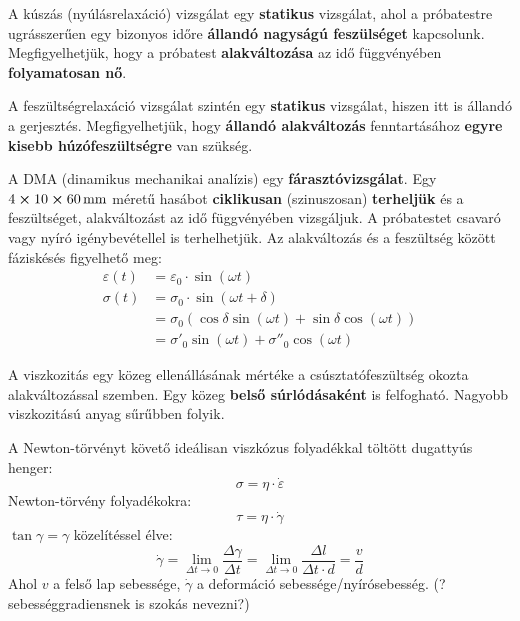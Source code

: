 \documentclass[12pt,a4paper]{article}       %
\begin{document}
\begin{tcbitemize}
  \tcbitem[title={\# \thetcbrasternum{} –
        Mi a kúszás?
      }]
  A kúszás (nyúlásrelaxáció) vizsgálat egy \textbf{statikus} vizsgálat, ahol a
  próbatestre ugrásszerűen egy bizonyos időre \textbf{állandó nagyságú
    feszülséget} kapcsolunk. Megfigyelhetjük, hogy a próbatest
  \textbf{alakváltozása} az idő függvényében \textbf{folyamatosan nő}.



  \tcbitem[title={\# \thetcbrasternum{} –
        Mi a feszültségrelaxáció?
      }]
  A feszültségrelaxáció vizsgálat szintén egy \textbf{statikus} vizsgálat,
  hiszen itt is állandó a gerjesztés. Megfigyelhetjük, hogy \textbf{állandó
    alakváltozás} fenntartásához \textbf{egyre kisebb húzófeszültségre} van
  szükség.




  \tcbitem[title={\# \thetcbrasternum{} –
        Mi a DM(T)A?
      }]
  A DMA (dinamikus mechanikai analízis) egy \textbf{fárasztóvizsgálat}. Egy $4
    \cross 10 \cross 60 \, \mathrm{mm}$ méretű hasábot \textbf{ciklikusan}
  (szinuszosan) \textbf{terheljük} és a feszültséget, alakváltozást az idő
  függvényében vizsgáljuk. A próbatestet csavaró vagy nyíró igénybevétellel is
  terhelhetjük. Az alakváltozás és a feszültség között fáziskésés figyelhető
  meg:
  \begin{align*}
    \varepsilon(t) & = \varepsilon_0 \cdot \sin(\omega t)
    \\
    \sigma(t)      & = \sigma_0 \cdot \sin(\omega t + \delta)
    \\
                   & = \sigma_0 \left(
    \cos \delta \sin(\omega t) +
    \sin \delta \cos(\omega t)
    \right)
    \\
                   & = \sigma'_0 \sin(\omega t) + \sigma''_0 \cos(\omega t)
  \end{align*}



  \tcbitem[title={\# \thetcbrasternum{} –
        Definiálja a viszkozitást!
      }]
  A viszkozitás egy közeg ellenállásának mértéke a csúsztatófeszültség okozta
  alakváltozással szemben. Egy közeg \textbf{belső súrlódásaként} is
  felfogható. Nagyobb viszkozitású anyag sűrűbben folyik.



  \tcbitem[title={\# \thetcbrasternum{} –
        Írja fel a Newton törvényt folyadékok esetére!
      }]
  A Newton-törvényt követő ideálisan viszkózus folyadékkal töltött dugattyús
  henger:
  \[
    \sigma = \eta \cdot \dot{\varepsilon}
  \]
  Newton-törvény folyadékokra:
  \[
    \tau = \eta \cdot \dot{\gamma}
  \]
  $\tan{\gamma} = \gamma$ közelítéssel élve:
  \[
    \dot{\gamma}
    = \lim_{\Delta t \rightarrow 0} \frac{\Delta \gamma}{\Delta t}
    = \lim_{\Delta t \rightarrow 0} \frac{\Delta l}{\Delta t \cdot d}
    = \frac{v}{d}
  \]
  Ahol $v$ a felső lap sebessége, $\dot{\gamma}$ a deformáció
  sebessége/nyírósebesség. (?sebességgradiensnek is szokás nevezni?)




\end{tcbitemize}
\end{document}
